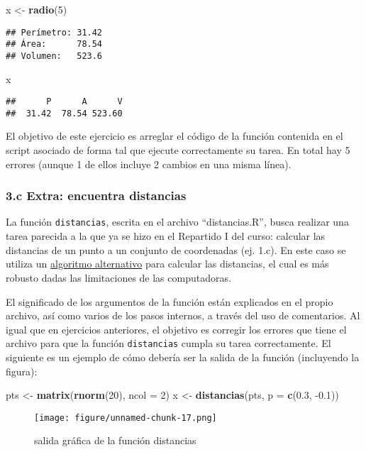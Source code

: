 \documentclass[]{article}
\makeatletter
\newenvironment{Shaded}{}{}
\newcommand{\KeywordTok}[1]{\textcolor[rgb]{0.00,0.44,0.13}{\textbf{{#1}}}}
\newcommand{\DataTypeTok}[1]{\textcolor[rgb]{0.56,0.13,0.00}{{#1}}}
\newcommand{\DecValTok}[1]{\textcolor[rgb]{0.25,0.63,0.44}{{#1}}}
\newcommand{\FloatTok}[1]{\textcolor[rgb]{0.25,0.63,0.44}{{#1}}}
\newcommand{\NormalTok}[1]{{#1}}
\def\maxwidth{\ifdim\Gin@nat@width>\linewidth\linewidth
\else\Gin@nat@width\fi}
\let\Oldincludegraphics\includegraphics
\renewcommand{\includegraphics}[1]{\Oldincludegraphics[width=\maxwidth]{#1}}
\makeatother
\begin{document}
\begin{Shaded}
\begin{Highlighting}[]
\NormalTok{x <- }\KeywordTok{radio}\NormalTok{(}\DecValTok{5}\NormalTok{)}
\end{Highlighting}
\end{Shaded}
\begin{verbatim}
## Perímetro: 31.42 
## Área:      78.54 
## Volumen:   523.6
\end{verbatim}
\begin{Shaded}
\begin{Highlighting}[]
\NormalTok{x}
\end{Highlighting}
\end{Shaded}
\begin{verbatim}
##      P      A      V 
##  31.42  78.54 523.60
\end{verbatim}
El objetivo de este ejercicio es arreglar el código de la función
contenida en el script asociado de forma tal que ejecute correctamente
su tarea. En total hay 5 errores (aunque 1 de ellos incluye 2 cambios en
una misma línea).

\subsubsection{3.c Extra: encuentra distancias}

La función \texttt{distancias}, escrita en el archivo ``distancias.R'',
busca realizar una tarea parecida a la que ya se hizo en el Repartido I
del curso: calcular las distancias de un punto a un conjunto de
coordenadas (ej. 1.c). En este caso se utiliza un
\href{http://www.johndcook.com/blog/2010/06/02/whats-so-hard-about-finding-a-hypotenuse/}{algoritmo
alternativo} para calcular las distancias, el cual es más robusto dadas
las limitaciones de las computadoras.

El significado de los argumentos de la función están explicados en el
propio archivo, así como varios de los pasos internos, a través del uso
de comentarios. Al igual que en ejercicios anteriores, el objetivo es
corregir los errores que tiene el archivo para que la función
\texttt{distancias} cumpla su tarea correctamente. El siguiente es un
ejemplo de cómo debería ser la salida de la función (incluyendo la
figura):

\begin{Shaded}
\begin{Highlighting}[]
\NormalTok{pts <- }\KeywordTok{matrix}\NormalTok{(}\KeywordTok{rnorm}\NormalTok{(}\DecValTok{20}\NormalTok{), }\DataTypeTok{ncol =} \DecValTok{2}\NormalTok{)}
\NormalTok{x <- }\KeywordTok{distancias}\NormalTok{(pts, }\DataTypeTok{p =} \KeywordTok{c}\NormalTok{(}\FloatTok{0.3}\NormalTok{, -}\FloatTok{0.1}\NormalTok{))}
\end{Highlighting}
\end{Shaded}
\begin{figure}[htbp]
\centering
\texttt{[image: figure/unnamed-chunk-17.png]}
\caption{salida gráfica de la función distancias}
\end{figure}
\end{document}
